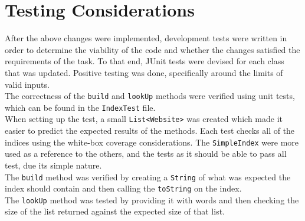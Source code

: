 \section{Testing Considerations}
After the above changes were implemented, development tests were written in order to determine the viability of the code and whether the changes satisfied the requirements of the task. To that end, JUnit tests were devised for each class that was updated. Positive testing was done, specifically around the limits of valid inputs.\\
The correctness of the {\tt build} and {\tt lookUp} methods were verified using unit tests, which can be found in the {\tt IndexTest} file.\\
When setting up the test, a small {\tt List<Website>} was created which made it easier to predict the expected results of the methods. Each test checks all of the indices using the white-box coverage considerations. The {\tt SimpleIndex} were more used as a reference to the others, and the tests as it should be able to pass all test, due its simple nature.\\
The {\tt build} method was verified by creating a {\tt String} of what was expected the index should contain and then calling the {\tt toString} on the index.\\
The {\tt lookUp} method was tested by providing it with words and then checking the size of the list returned against the expected size of that list.
